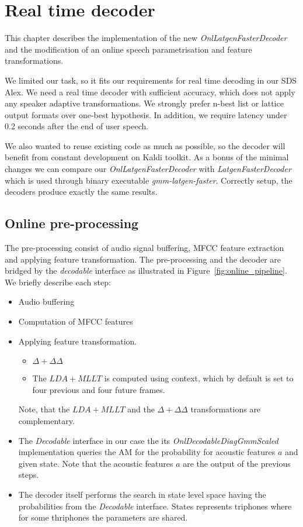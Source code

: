 \chapter{Real time decoder}
\label{cha:decoder}

This chapter describes the implementation
of the new {\it OnlLatgenFasterDecoder}\/ and 
the modification of an online speech parametrisation and feature transformations.

We limited our task, so it fits our requirements for real time decoding
in our \ac{SDS} Alex.
We need a real time decoder with sufficient accuracy,
which does not apply any speaker adaptive transformations.
We strongly prefer n-best list or lattice output formats over one-best hypothesis.
In addition, we require latency under 0.2 seconds after the end of user speech.

We also wanted to reuse existing code as much as possible,
so the decoder will benefit from constant development on Kaldi toolkit.
As a bonus of the minimal changes we can compare our {\it OnlLatgenFasterDecoder}\/ 
with {\it LatgenFasterDecoder}\/ which is used through binary executable {\it gmm-latgen-faster}.
Correctly setup, the decoders produce exactly the same results.


\section{Online pre-processing} 
\label{sec:onl_preprocess}
The pre-processing consist of audio signal buffering, \ac{MFCC} feature extraction and
applying feature transformation. 
The pre-processing and the decoder are bridged by the {\it decodable} 
interface as illustrated in Figure~\ref{fig:online_pipeline}.
We briefly describe each step:
\begin{itemize}
    \item Audio buffering
    \item Computation of \ac{MFCC} features
    \item Applying feature transformation. 
        \begin{itemize}
            \item $\Delta + \Delta\Delta$ 
            \item The $LDA+MLLT$ is computed using context,
                which by default is set to four previous and four future frames.
        \end{itemize}
        Note, that the $LDA+MLLT$ and the $\Delta+\Delta\Delta$ transformations are complementary.
    \item The {\it Decodable}\/ interface in our case the its {\it OnlDecodableDiagGmmScaled}\/ implementation
        queries the \ac{AM} for the probability for acoustic features $a$ and given state.
        Note that the acoustic features $a$ are the output of the previous steps.
    \item The decoder itself performs the search in state level space 
        having the probabilities from the {\it Decodable}\/ interface. 
        States represents triphones where for some thriphones the parameters are shared.
\end{itemize}

